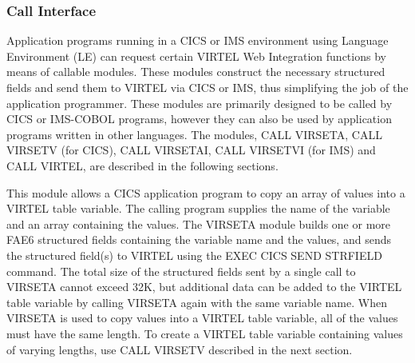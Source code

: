 \documentclass[letterpaper,10pt,english]{sphinxmanual}
\begin{document}


\subsubsection{Call Interface}
\label{\detokenize{User_Guide:call-interface}}

Application programs running in a CICS or IMS environment using Language Environment (LE) can request certain
VIRTEL Web Integration functions by means of callable modules. These modules construct the necessary structured
fields and send them to VIRTEL via CICS or IMS, thus simplifying the job of the application programmer. These modules
are primarily designed to be called by CICS or IMS-COBOL programs, however they can also be used by application
programs written in other languages. The modules, CALL VIRSETA, CALL VIRSETV (for CICS), CALL VIRSETAI, CALL
VIRSETVI (for IMS) and CALL VIRTEL, are described in the following sections.


This module allows a CICS application program to copy an array of values into a VIRTEL table variable. The calling
program supplies the name of the variable and an array containing the values. The VIRSETA module builds one or more
FAE6 structured fields containing the variable name and the values, and sends the structured field(s) to VIRTEL using
the EXEC CICS SEND STRFIELD command.
The total size of the structured fields sent by a single call to VIRSETA cannot exceed 32K, but additional data can be
added to the VIRTEL table variable by calling VIRSETA again with the same variable name.
When VIRSETA is used to copy values into a VIRTEL table variable, all of the values must have the same length. To
create a VIRTEL table variable containing values of varying lengths, use CALL VIRSETV described in the next section.

\end{document}

